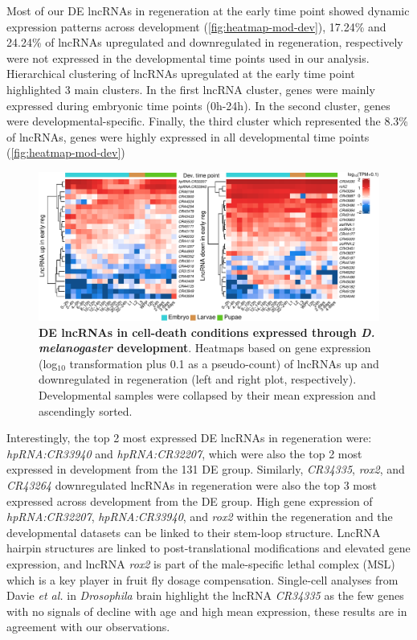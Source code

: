 Most of our DE lncRNAs in regeneration at the early time point showed dynamic expression patterns across development (\autoref{fig:heatmap-mod-dev}), 17.24\% and 24.24\% of lncRNAs upregulated and downregulated in regeneration, respectively were not expressed in the developmental time points used in our analysis. Hierarchical clustering of lncRNAs upregulated at the early time point highlighted 3 main clusters. In the first lncRNA cluster, genes were mainly expressed during embryonic time points (0h-24h). In the second cluster, genes were developmental-specific. Finally, the third cluster which represented the 8.3\% of lncRNAs, genes were highly expressed in all developmental time points (\autoref{fig:heatmap-mod-dev})

\begin{figure}[ht!]
  \centering
  \includegraphics[scale=0.6]{plots/results/dme/two.heatmaps.modencode.pdf}
  \caption[DE lncRNAs expressed through development]{\textbf{DE lncRNAs in cell-death conditions expressed through \textit{D. melanogaster} development}. Heatmaps based on gene expression (log$_{10}$ transformation plus 0.1 as a pseudo-count) of lncRNAs up and downregulated in regeneration (left and right plot, respectively). Developmental samples were collapsed by their mean expression and ascendingly sorted.}
  \label{fig:heatmap-mod-dev}
\end{figure}

Interestingly, the top 2 most expressed DE lncRNAs in regeneration were: \textit{hpRNA:CR33940} and \textit{hpRNA:CR32207}, which were also the top 2 most expressed in development from the 131 DE group. Similarly, \textit{CR34335}, \textit{rox2}, and \textit{CR43264} downregulated lncRNAs in regeneration were also the top 3 most expressed across development from the DE group. High gene expression of \textit{hpRNA:CR32207}, \textit{hpRNA:CR33940}, and \textit{rox2} within the regeneration and the developmental datasets can be linked to their stem-loop structure. LncRNA hairpin structures are linked to post-translational modifications and elevated gene expression,\autocite{statello_2021_lncRNA_reg} and lncRNA \textit{rox2} is part of the male-specific lethal complex (MSL) which is a key player in fruit fly dosage compensation.\autocite{flintoft_2013_rox,ilik_2013_rox} Single-cell analyses from Davie \textit{et al.} in \textit{Drosophila} brain highlight the lncRNA \textit{CR34335} as the few genes with no signals of decline with age and high mean expression,\autocite{davie_2018} these results are in agreement with our observations. 

